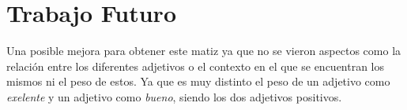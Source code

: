 \section{Trabajo Futuro}

Una posible mejora para obtener este matiz  ya que no se vieron aspectos como la relación entre los diferentes adjetivos o el contexto en el que se encuentran los mismos ni el peso de estos. Ya que es muy distinto el peso de un adjetivo como \emph{exelente} y un adjetivo como \emph{bueno}, siendo los dos adjetivos positivos.
